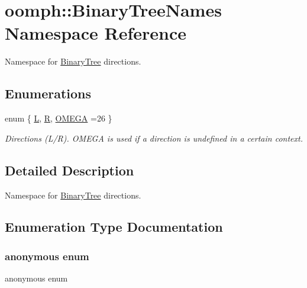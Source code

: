 \hypertarget{namespaceoomph_1_1BinaryTreeNames}{}\section{oomph\+:\+:Binary\+Tree\+Names Namespace Reference}
\label{namespaceoomph_1_1BinaryTreeNames}


Namespace for \hyperlink{classoomph_1_1BinaryTree}{Binary\+Tree} directions.  


\subsection*{Enumerations}
\begin{DoxyCompactItemize}
\item 
enum \{ \hyperlink{namespaceoomph_1_1BinaryTreeNames_a7ff5e7e46beae31bf81579531b1f9895a8df863dabb4096fa066f7a6dbf7502d1}{L}, 
\hyperlink{namespaceoomph_1_1BinaryTreeNames_a7ff5e7e46beae31bf81579531b1f9895a1bf47d3f36e6272d94344ae84aca2498}{R}, 
\hyperlink{namespaceoomph_1_1BinaryTreeNames_a7ff5e7e46beae31bf81579531b1f9895afbb1d921b86ded476b8bee384d9059e1}{O\+M\+E\+GA} =26
 \}\begin{DoxyCompactList}\small\item\em Directions (L/R). O\+M\+E\+GA is used if a direction is undefined in a certain context. \end{DoxyCompactList}
\end{DoxyCompactItemize}


\subsection{Detailed Description}
Namespace for \hyperlink{classoomph_1_1BinaryTree}{Binary\+Tree} directions. 

\subsection{Enumeration Type Documentation}
\mbox{\label{namespaceoomph_1_1BinaryTreeNames_a7ff5e7e46beae31bf81579531b1f9895}} 
\subsubsection{\texorpdfstring{anonymous enum}{anonymous enum}}
{\footnotesize\ttfamily anonymous enum}



